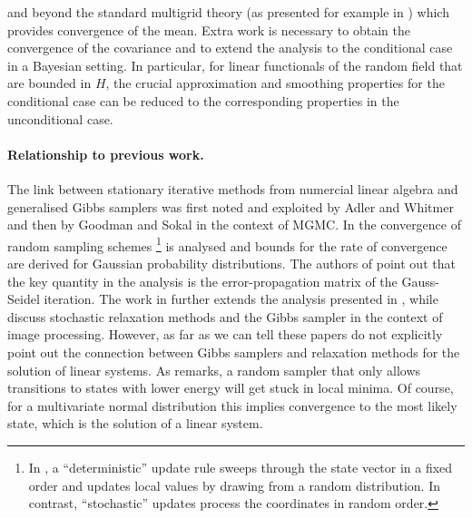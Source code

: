 \documentclass[11pt,english]{article}
\theoremstyle{plain}
\theoremstyle{plain}
\theoremstyle{plain}
\theoremstyle{plain}
\numberwithin{equation}{section}
\newcommand{\jg}[1]{#1}
\begin{document}
and beyond the standard multigrid theory (as presented for example in \cite{Hackbusch.W_2016_IterativeSolutionLarge}) which provides convergence of the mean. Extra work is necessary to obtain the convergence of the covariance and to extend the analysis to the conditional case in a Bayesian setting. In particular, for linear functionals of the random field that are bounded in $H$, the crucial approximation and smoothing properties for the conditional case can be reduced to the corresponding properties in the unconditional case.\vspace{-1ex}
\paragraph{Relationship to previous work.}
The link between stationary iterative methods from numercial linear algebra and generalised Gibbs samplers was first noted and exploited by Adler and Whitmer \cite{adler1981over,whitmer1984over} and then by Goodman and Sokal \cite{goodman1989multigrid} in the context of MGMC. 
\jg{In \cite{amit1991comparing} the convergence of random sampling schemes%
	\footnote{\jg{In \cite{amit1991comparing}, a ``deterministic'' update rule sweeps through the state vector in a fixed order and updates local values by drawing from a random distribution. In contrast, ``stochastic'' updates process the coordinates in random order.}}
	is analysed and bounds for the rate of convergence are derived for Gaussian probability distributions. The authors of \cite{amit1991comparing} point out that the key quantity in the analysis is the error-propagation matrix of the Gauss-Seidel iteration. The work in \cite{Amit1991,Amit1996} further extends the analysis presented in \cite{amit1991comparing},} 
%
      \jg{while \cite{geman1984stochastic,geman1993stochastic} discuss stochastic relaxation methods and the Gibbs sampler in the context of image processing. However, as far as we can tell these papers do not explicitly point out the connection between Gibbs samplers and  relaxation methods for the solution of linear systems. As \cite{geman1984stochastic} remarks, a random sampler that only allows transitions to states with lower energy will get stuck in local minima.
Of course, for a multivariate normal distribution this implies convergence to the most likely state, which is the solution of a linear system.}
\end{document}
